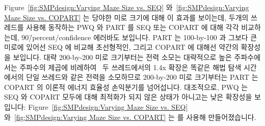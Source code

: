 Figure~\ref{fig:SMPdesign:Varying Maze Size vs. SEQ}
와~\ref{fig:SMPdesign:Varying Maze Size vs. COPART}
는 당야한 미로 크기에 대해 이 효과를 보이는데, 두개의 쓰레드를 사용해 동작하는
PWQ 와 PART 를 SEQ 또는 COPART 에 대해 각각 비교하는데,
90\=/percent\-/confidence 에러바도 보입니다.
PART 는 100-by-100 과 그보다 큰 미로에 있어선 SEQ 에 비교해 초선형적인, 그리고
COPART 에 대해선 약간의 확장성을 보입니다.
대략 200-by-200 미로 크기부터는 전력 소모는 대략적으로 높은 주파수에서는
주파수의 제곱에 비례하여~\cite{TrevorMudge2000Power} 두 쓰레드에서의 1.4x
확장은 똑같은 해법 탐색 시간에서의 단일 쓰레드와 같은 전력을 소모하므로
200-by-200 미로 크기부터는 PART 는 COPART 의 이론적 에너지 효율성 손익분기를
넘어섭니다.
대조적으로, PWQ 는 SEQ 와 COPART 모두에 대해 최적화가 되지 않은 상태가 아니고는
낮은 확장성을 보입니다: Figure~\ref{fig:SMPdesign:Varying Maze Size vs. SEQ} 
와~\ref{fig:SMPdesign:Varying Maze Size vs. COPART}
는  를 사용해 만들어졌습니다.

